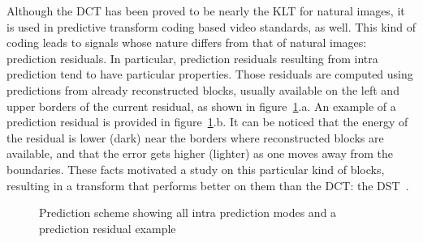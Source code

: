 \documentclass[11pt,a4paper,openright,twoside]{book}
\numberwithin{equation}{section} %
\numberwithin{figure}{section} %
\numberwithin{table}{section} %
\begin{document}
Although the \ac{DCT} has been proved to be nearly the \ac{KLT} for natural
images, it is used in predictive transform coding based video standards, as
well.
This kind of coding leads to signals whose nature differs from that of
natural images: prediction residuals.
In particular, prediction residuals resulting from intra prediction tend
to have particular properties.
Those residuals are computed using predictions from already
reconstructed blocks, usually available on the left and upper borders of
the current residual, as shown in figure~\ref{fig:pred_scheme}.a.
An example of a prediction residual is provided in
figure~\ref{fig:pred_scheme}.b.
It can be noticed that the energy of the residual is lower (dark) near
the borders where reconstructed blocks are available, and that the error
gets higher (lighter) as one moves away from the boundaries.
These facts motivated a study on this particular kind of blocks,
resulting in a transform that performs better on them than the \ac{DCT}:
the \ac{DST}~\cite{han-10-spatial-adaptive-transform}.
\begin{figure}[tb]
	\centering
	\hspace{0.2\linewidth}
	\caption{Prediction scheme showing all intra prediction modes and a
	prediction residual example}
	\label{fig:pred_scheme}
\end{figure}
\end{document}
